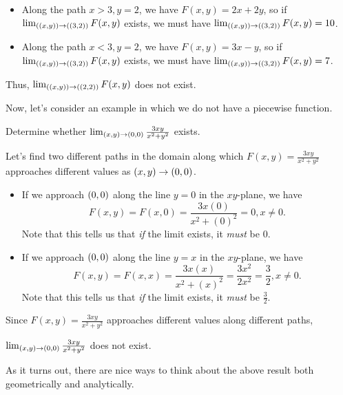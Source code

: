 \documentclass{ximera}
\begin{document}
\begin{example}
\begin{example}
\begin{explanation}
\begin{itemize}
\item Along the path $x>3, y=2$, we have $F(x,y) = 2x+2y$, so if $\lim_{\left(\left(x,y\right)\right) \to \left(\left(3,2\right)\right)} F(x,y)$ exists, we must have $\lim_{\left(\left(x,y\right)\right) \to \left(\left(3,2\right)\right)} F(x,y) = 10$.
\item Along the path $x<3, y=2$, we have $F(x,y) = 3x-y$, so if $\lim_{\left(\left(x,y\right)\right) \to \left(\left(3,2\right)\right)} F(x,y)$ exists, we must have $\lim_{\left(\left(x,y\right)\right) \to \left(\left(3,2\right)\right)} F(x,y) = 7$.
\end{itemize}
Thus, $\lim_{\left(\left(x,y\right)\right) \to \left(\left(2,2\right)\right)} F(x,y)$ does not exist.
\end{explanation}
\end{example}
\end{example}

Now, let's consider an example in which we do not have a piecewise function.

\begin{example}
  Determine whether $\lim_{\left(x,y\right)\to\left(0,0\right)} \frac{3xy}{x^2+y^2}$ exists.

  \begin{explanation}
  Let's find two different paths in the domain along which $F(x,y)=\frac{3xy}{x^2+y^2}$ approaches different values as $\left(x,y\right) \to \left(0,0\right)$.

  \begin{itemize}
  \item If we approach $\left(0,0\right)$ along the line $y=0$ in the $xy$-plane, we have
    \[
  F(x,y) = F(x,0) =  \frac{3x(0)}{x^2+(0)^2} = 0, x \neq 0.
  \]
  Note that this tells us that \emph{if} the limit exists, it \emph{must} be $0$.

 \item If we approach $\left(0,0\right)$ along the line $y=x$ in the $xy$-plane, we have
   \[
  F(x,y) = F(x,x) =  \frac{3x(x)}{x^2+(x)^2} = \frac{3x^2}{2x^2} = \frac{3}{2}, x \neq 0.
  \]
  Note that this tells us that \emph{if} the limit exists, it \emph{must} be $\frac{3}{2}$.

 \end{itemize}

 Since $F(x,y)=\frac{3xy}{x^2+y^2}$ approaches different values along different paths,

  $\lim_{\left(x,y\right)\to\left(0,0\right)} \frac{3xy}{x^2+y^2}$ does not exist.
 \end{explanation}
 \end{example}

 As it turns out, there are nice ways to think about the above result both geometrically and analytically.
\end{document}
